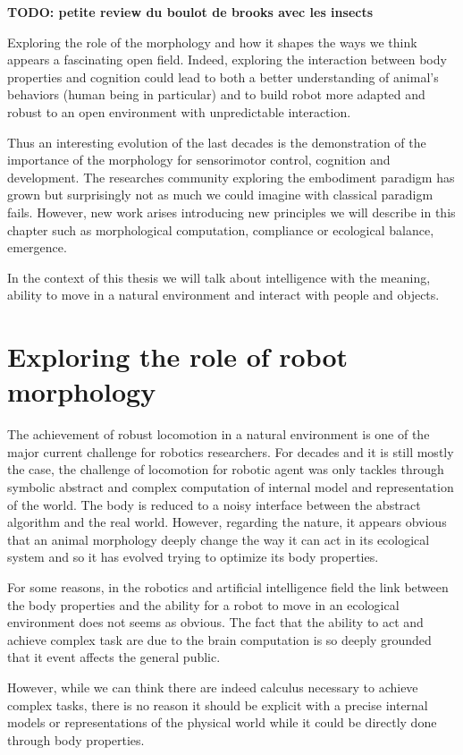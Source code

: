 \textbf{TODO: petite review du boulot de brooks avec les insects}

Exploring the role of the morphology and how it shapes the ways we think appears a fascinating open field. Indeed, exploring the interaction between body properties and cognition could lead to both a better understanding of animal's behaviors (human being in particular) and to build robot more adapted and robust to an open environment with unpredictable interaction.

Thus an interesting evolution of the last decades is the demonstration of the importance of the morphology for sensorimotor control, cognition and development. The researches community exploring the embodiment paradigm has grown but surprisingly not as much we could imagine with classical paradigm fails. However, new work arises introducing new principles we will describe in this chapter such as morphological computation, compliance or ecological balance, emergence.

In the context of this thesis we will talk about intelligence with the meaning, ability to move in a natural environment and interact with people and objects.



\section{Exploring the role of robot morphology} %


The achievement of robust locomotion in a natural environment is one of the major current challenge for robotics researchers. For decades and it is still mostly the case, the challenge of locomotion for robotic agent was only tackles through symbolic abstract and complex computation of internal model and representation of the world. The body is reduced to a noisy interface between the abstract algorithm and the real world.
However, regarding the nature, it appears obvious that an animal morphology deeply change the way it can act in its ecological system and so it has evolved trying to optimize its body properties.

For some reasons, in the robotics and artificial intelligence field the link between the body properties and the ability for a robot to move in an ecological environment does not seems as obvious. The fact that the ability to act and achieve complex task are due to the brain computation is so deeply grounded that it event affects the general public.

However, while we can think there are indeed calculus necessary to achieve complex tasks, there is no reason it should be explicit with a precise internal models or representations of the physical world while it could be directly done through body properties.

